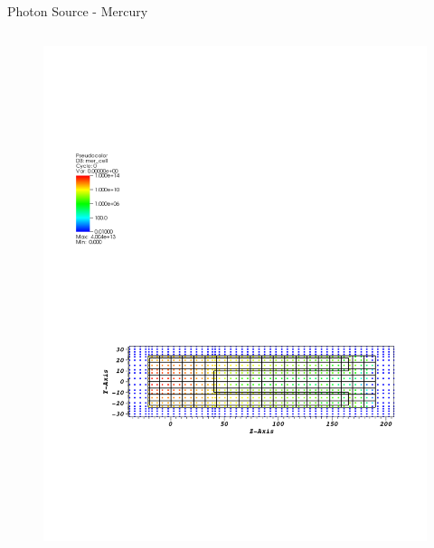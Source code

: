 \documentclass{beamer}
\begin{document}
\begin{frame}{Photon Source - Mercury}
\begin{columns}[T]


        \begin{figure}
                \includegraphics[scale=0.49,trim={1cm 16cm 9cm 5cm},clip]{figs/src_mer_cell.pdf}
        \end{figure}
\end{columns}

\begin{columns}[T]


\end{columns}
\end{frame}
\end{document}
